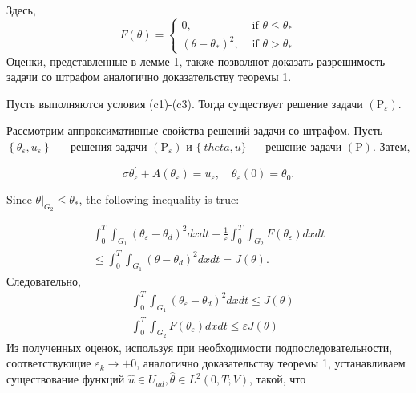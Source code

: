 Здесь,
\[
    F(\theta)=
    \begin{cases}
        0, & \text { if } \theta \leq \theta_{*} \\
        \left(\theta-\theta_{*}\right)^{2},
        & \text { if } \theta>\theta_{*}
    \end{cases}
\]
Оценки, представленные в лемме 1, также позволяют доказать разрешимость
задачи со штрафом аналогично доказательству теоремы 1.

\begin{theorem}
    \label{th:3_2:2}
    Пусть выполняются условия (c1)-(c3).
    Тогда существует решение задачи $\left(\mathrm{P}_{\varepsilon}\right)$.
\end{theorem}

Рассмотрим аппроксимативные свойства решений задачи со штрафом.
Пусть $\left\{\theta_{\varepsilon}, u_{\varepsilon}\right\}$ — решения задачи
$\left(\mathrm{P}_{\varepsilon}\right)$ и $\{\ theta, u\}$
— решение задачи $(\mathrm{P})$.
Затем,

\begin{equation}
    \label{eq:3_2:8}
    \sigma \theta_{\varepsilon}^{\prime}
    +A\left(\theta_{\varepsilon}\right)=u_{\varepsilon},
    \quad \theta_{\varepsilon}(0)=\theta_{0}.
\end{equation}

Since $\left.\theta\right|_{G_{2}} \leq \theta_{*}$, the following inequality is true:

\[
    \begin{array}{r}
        \int_{0}^{T} \int_{G_{1}}\left(\theta_{\varepsilon}
        -\theta_{d}\right)^{2} d x d t+\frac{1}{\varepsilon}
        \int_{0}^{T} \int_{G_{2}}
        F\left(\theta_{\varepsilon}\right) d x d t \\
        \leq \int_{0}^{T} \int_{G_{1}}
        \left(\theta-\theta_{d}\right)^{2} d x d t=J(\theta).
    \end{array}
\]
Следовательно,
\[
    \begin{aligned}
        &\int_{0}^{T} \int_{G_{1}}\left(\theta_{\varepsilon}
        -\theta_{d}\right)^{2} d x d t \leq J(\theta) \\
        &\int_{0}^{T} \int_{G_{2}} F
        \left(\theta_{\varepsilon}\right) d x d t \leq \varepsilon J(\theta)
    \end{aligned}
\]
Из полученных оценок, используя при необходимости подпоследовательности,
соответствующие $\varepsilon_{k} \rightarrow+0$,
аналогично доказательству теоремы 1, устанавливаем существование
функций $\widehat{u} \in U_{a d}, \widehat{\theta} \in L^{2}(0, T ; V)$, такой, что

